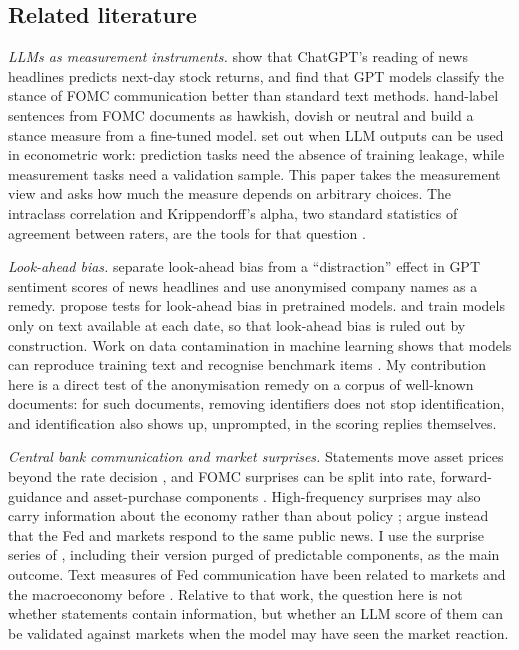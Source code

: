 \documentclass[11pt]{article}
\begin{document}
\subsection{Related literature}

\emph{LLMs as measurement instruments.} \citet{lopezlira2023} show that ChatGPT's reading of news
headlines predicts next-day stock returns, and \citet{hansen2024kazinnik} find that GPT models classify
the stance of FOMC communication better than standard text methods. \citet{shah2023} hand-label sentences
from FOMC documents as hawkish, dovish or neutral and build a stance measure from a fine-tuned model.
\citet{ludwig2024} set out when LLM outputs can be used in econometric work: prediction tasks need the
absence of training leakage, while measurement tasks need a validation sample. This paper takes the
measurement view and asks how much the measure depends on arbitrary choices. The intraclass correlation
and Krippendorff's alpha, two standard statistics of agreement between raters, are the tools for that
question \citep{shrout1979,hayes2007,krippendorff2018}.

\emph{Look-ahead bias.} \citet{glasserman2023} separate look-ahead bias from a ``distraction'' effect in
GPT sentiment scores of news headlines and use anonymised company names as a remedy. \citet{sarkar2024}
propose tests for look-ahead bias in pretrained models. \citet{he2025} and \citet{drinkall2024} train
models only on text available at each date, so that look-ahead bias is ruled out by construction. Work on
data contamination in machine learning shows that models can reproduce training text and recognise
benchmark items \citep{carlini2021,golchin2024}. My contribution here is a direct test of the
anonymisation remedy on a corpus of well-known documents: for such documents, removing identifiers does
not stop identification, and identification also shows up, unprompted, in the scoring replies
themselves.

\emph{Central bank communication and market surprises.} Statements move asset prices beyond the rate
decision \citep{gurkaynak2005}, and FOMC surprises can be split into rate, forward-guidance and
asset-purchase components \citep{swanson2021}. High-frequency surprises may also carry information about
the economy rather than about policy \citep{nakamura2018,jarocinski2020}; \citet{bauer2023alternative}
argue instead that the Fed and markets respond to the same public news. I use the surprise series of
\citet{bauer2023reassessment}, including their version purged of predictable components, as the main
outcome. Text measures of Fed communication have been related to markets and the macroeconomy before
\citep{lucca2009,hansen2016,gardner2022}. Relative to that work, the question here is not whether
statements contain information, but whether an LLM score of them can be validated against markets when
the model may have seen the market reaction.
\end{document}
